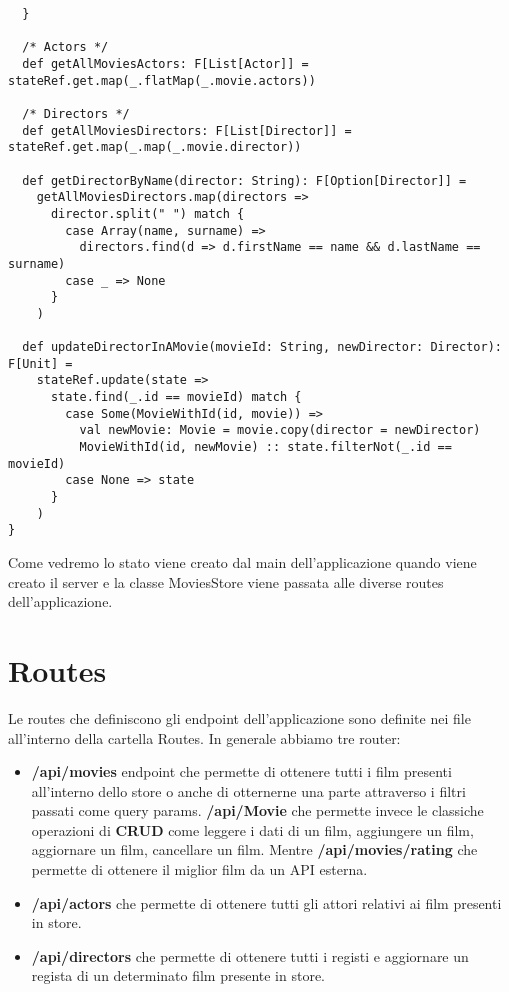 \begin{verbatim}
  }

  /* Actors */
  def getAllMoviesActors: F[List[Actor]] = stateRef.get.map(_.flatMap(_.movie.actors))

  /* Directors */
  def getAllMoviesDirectors: F[List[Director]] = stateRef.get.map(_.map(_.movie.director))

  def getDirectorByName(director: String): F[Option[Director]] =
    getAllMoviesDirectors.map(directors =>
      director.split(" ") match {
        case Array(name, surname) =>
          directors.find(d => d.firstName == name && d.lastName == surname)
        case _ => None
      }
    )

  def updateDirectorInAMovie(movieId: String, newDirector: Director): F[Unit] =
    stateRef.update(state =>
      state.find(_.id == movieId) match {
        case Some(MovieWithId(id, movie)) =>
          val newMovie: Movie = movie.copy(director = newDirector)
          MovieWithId(id, newMovie) :: state.filterNot(_.id == movieId)
        case None => state
      }
    )
}
\end{verbatim}

\noindent Come vedremo lo stato viene creato dal main dell'applicazione quando viene creato il server e la classe MoviesStore viene passata alle diverse routes dell’applicazione.

\section{Routes}
Le routes che definiscono gli endpoint dell'applicazione sono definite nei file all'interno della cartella Routes. In generale abbiamo tre router:
\begin{itemize}
    \item \textbf{/api/movies} endpoint che permette di ottenere tutti i film presenti all'interno dello store o anche di otternerne una parte attraverso i filtri passati come query params. \textbf{/api/Movie} che permette invece le classiche operazioni di \textbf{CRUD} come leggere i dati di un film, aggiungere un film, aggiornare un film, cancellare un film. Mentre \textbf{/api/movies/rating} che permette di ottenere il miglior film da un API esterna.
    \item \textbf{/api/actors} che permette di  ottenere tutti gli attori relativi ai film presenti in store.
    \item \textbf{/api/directors} che permette di ottenere tutti i registi e aggiornare un regista di un determinato film presente in store.
\end{itemize}

